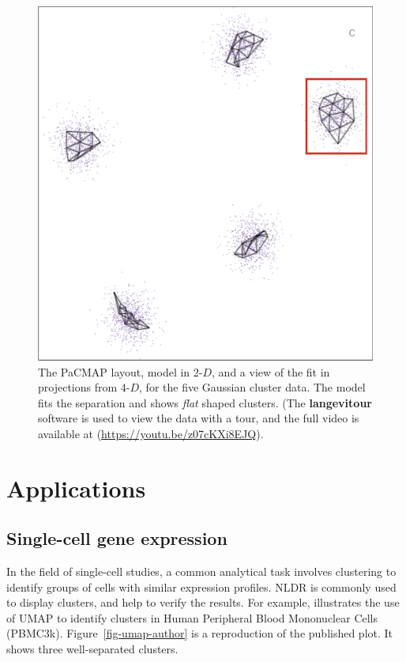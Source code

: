 \documentclass[
  12pt]{article}
\newcommand\gD{$2\text{-}D$}
\begin{document}
\begin{figure}[H]
%
\begin{minipage}{0.33\linewidth}
\includegraphics{figures/five_gau_clusters/sc_pacmap_2.png}\end{minipage}%

\caption{\label{fig-gau-pacmap-sc}The PaCMAP layout, model in \gD{}, and
a view of the fit in projections from \(4\text{-}D\), for the five
Gaussian cluster data. The model fits the separation and shows
\emph{flat} shaped clusters. (The \textbf{langevitour} software is used
to view the data with a tour, and the full video is available at
(\url{https://youtu.be/z07cKXi8EJQ}).}

\end{figure}%

\section{Applications}\label{sec-applications}

\subsection{Single-cell gene
expression}\label{single-cell-gene-expression}

In the field of single-cell studies, a common analytical task involves
clustering to identify groups of cells with similar expression profiles.
NLDR is commonly used to display clusters, and help to verify the
results. For example, \citet{chen2023} illustrates the use of UMAP to
identify clusters in Human Peripheral Blood Mononuclear Cells (PBMC3k).
Figure~\ref{fig-umap-author} is a reproduction of the published plot. It
shows three well-separated clusters.
\end{document}
